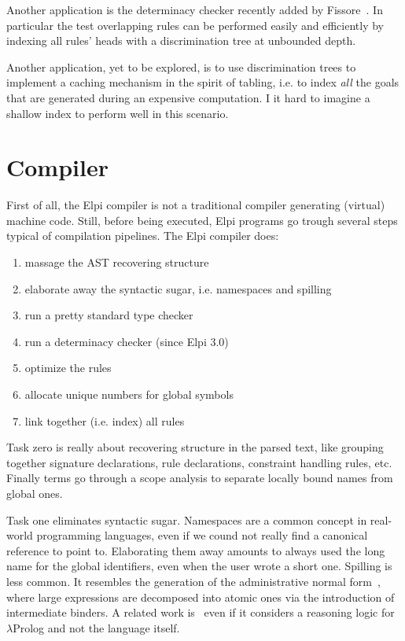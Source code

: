 \documentclass[a4paper, 11pt]{book}
\begin{document}
Another application is the determinacy checker recently added by
Fissore~\cite{elpidet}. In particular the test overlapping rules
can be performed easily and efficiently by indexing all rules' heads with
a discrimination tree at unbounded depth.

Another application, yet to be explored, is to use discrimination trees
to implement a caching mechanism in the spirit of tabling, i.e. to index
\emph{all} the goals that are generated during an expensive computation.
I it hard to imagine a shallow index to perform well in this scenario.

\section{Compiler}\label{sec:compiler}

First of all, the Elpi compiler is not a traditional compiler generating (virtual)
machine code. Still, before being executed, Elpi programs go trough several
steps typical of compilation pipelines. The Elpi compiler does:

\begin{enumerate}
  \setcounter{enumi}{0}
  \item massage the AST recovering structure
  \item elaborate away the syntactic sugar, i.e. namespaces and spilling
  \item run a pretty standard type checker
  \item run a determinacy checker (since Elpi 3.0)
  \item optimize the rules
  \item allocate unique numbers for global symbols
  \item link together (i.e. index) all rules
\end{enumerate}

\noindent
Task zero is really about recovering structure in the parsed text, like
grouping together signature declarations, rule declarations, constraint
handling rules, etc. Finally terms go through a scope analysis to separate
locally bound names from global ones.

Task one eliminates syntactic sugar. Namespaces are a common concept in
real-world programming languages, even if we cound not really find a
canonical reference to point to. Elaborating them away amounts to always
used the long name for the global identifiers, even when the user wrote
a short one. Spilling is less common. It resembles the generation of
the administrative normal form~\cite{10.1145/141478.141563}, where large
expressions are decomposed into atomic ones via the introduction of
intermediate binders. A related work is~\cite{chaudhuri:hal-01806154}
even if it considers a reasoning logic for $\lambda$Prolog and not the
language itself.
\end{document}
